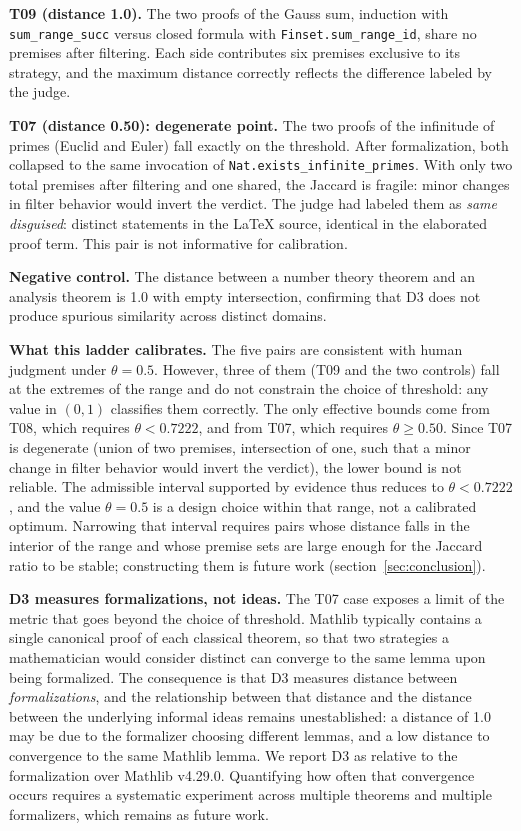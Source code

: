 \documentclass{article}
\theoremstyle{remark}
\begin{document}
\textbf{T09 (distance 1.0).} The two proofs of the Gauss sum, induction with \texttt{sum\_range\_succ} versus closed formula with \texttt{Finset.sum\_range\_id}, share no premises after filtering. Each side contributes six premises exclusive to its strategy, and the maximum distance correctly reflects the difference labeled by the judge.

\textbf{T07 (distance 0.50): degenerate point.} The two proofs of the infinitude of primes (Euclid and Euler) fall exactly on the threshold. After formalization, both collapsed to the same invocation of \texttt{Nat.exists\_infinite\_primes}. With only two total premises after filtering and one shared, the Jaccard is fragile: minor changes in filter behavior would invert the verdict. The judge had labeled them as \textit{same disguised}: distinct statements in the LaTeX source, identical in the elaborated proof term. This pair is not informative for calibration.

\textbf{Negative control.} The distance between a number theory theorem and an analysis theorem is 1.0 with empty intersection, confirming that D3 does not produce spurious similarity across distinct domains.

\textbf{What this ladder calibrates.} The five pairs are consistent with human judgment under $\theta = 0.5$. However, three of them (T09 and the two controls) fall at the extremes of the range and do not constrain the choice of threshold: any value in $(0,1)$ classifies them correctly. The only effective bounds come from T08, which requires $\theta < 0.7222$, and from T07, which requires $\theta \geq 0.50$. Since T07 is degenerate (union of two premises, intersection of one, such that a minor change in filter behavior would invert the verdict), the lower bound is not reliable. The admissible interval supported by evidence thus reduces to $\theta < 0.7222$, and the value $\theta = 0.5$ is a design choice within that range, not a calibrated optimum. Narrowing that interval requires pairs whose distance falls in the interior of the range and whose premise sets are large enough for the Jaccard ratio to be stable; constructing them is future work (section~\ref{sec:conclusion}).

\textbf{D3 measures formalizations, not ideas.} The T07 case exposes a limit of the metric that goes beyond the choice of threshold. Mathlib typically contains a single canonical proof of each classical theorem, so that two strategies a mathematician would consider distinct can converge to the same lemma upon being formalized. The consequence is that D3 measures distance between \textit{formalizations}, and the relationship between that distance and the distance between the underlying informal ideas remains unestablished: a distance of 1.0 may be due to the formalizer choosing different lemmas, and a low distance to convergence to the same Mathlib lemma. We report D3 as relative to the formalization over Mathlib v4.29.0. Quantifying how often that convergence occurs requires a systematic experiment across multiple theorems and multiple formalizers, which remains as future work.
\end{document}
